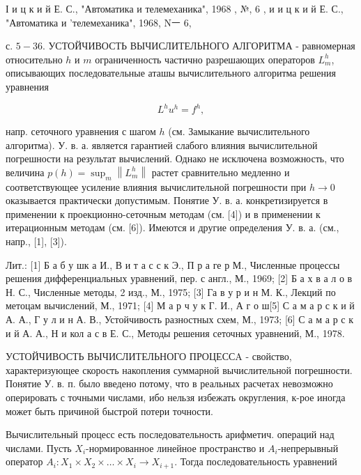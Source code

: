 \documentclass[10pt]{article}
\begin{document}
І и ц к и й Е. С., "Автоматика и телемеханика", 1968 , №, 6 , и и ц к и й Е. С., "Автоматика и 'телемеханика", 1968, Nㅡ 6,

с. $5-36$. УСТОЙЧИВОСТЬ ВЫЧИСЛИТЕЛЬНОГО АЛГОРИТМА - равномерная относительно $h$ и $m$ ограниченность частично разрешающих операторов $L_{m}^{h}$, описывающих последовательные аташы вычислительного алгоритма решения уравнения



\[

L^{h} u^{h}=f^{h},

\]



напр. сеточного уравнения с шагом $h$ (см. Замыкание вычислительного алгоритма). У. в. а. является гарантией слабого влияния вычислительной погрешности на результат вычислений. Однако не исключена возможность, что величина $p(h)=\sup _{m}\left\|L_{m}^{h}\right\|$ растет сравнительно медленно и соответствующее усиление влияния вычислительной погрешности при $h \rightarrow 0$ оказывается практически допустимым. Понятие У. в. а. конкретизируется в применении к проекционно-сеточным методам (см. [4]) и в применении к итерационным методам (см. [6]). Имеются и другие определения У. в. а. (см., напр., [1], [3]).



Лит.: [1] Б а б у шк а И., В и т а с с к Э., П р а ге р М., Численные процессы решения дифференциальных уравнений, пер. с англ., М., 1969; [2] Б а х в а л о в Н. С., Численные методы, 2 изд., М., 1975; [3] Га в у р и н М. К., Лекций по метоцам вычислений, М., 1971; [4] М а р ч у к Г. И., А г о ш[5] С а м а р с к и й А. А., Г у л и н А. В., Устойчивость разностных схем, М., 1973; [6] С а м а р с к и й А. А., Н и кол а с в Е. С., Методы решения сеточных уравнений, М., 1978.



УСТОЙЧИВОСТЬ ВЫЧИСЛИТЕЛЬНОГО ПРОЦЕССA - свойство, характеризующее скорость накопления суммарной вычислительной погрешности. Понятие У. в. п. было введено потому, что в реальных расчетах невозможно оперировать с точными числами, ибо нельзя избежать округления, к-рое иногда может быть причиной быстрой потери точности.



Вычислительный процесс есть последовательность арифметич. операций над числами. Пусть $X_{i}$-нормированное линейное пространство и $A_{i}$-непрерывный оператор $A_{i}: X_{1} \times X_{2} \times \ldots \times X_{i} \rightarrow X_{i+1}$. Тогда последовательность уравнений
\end{document}
